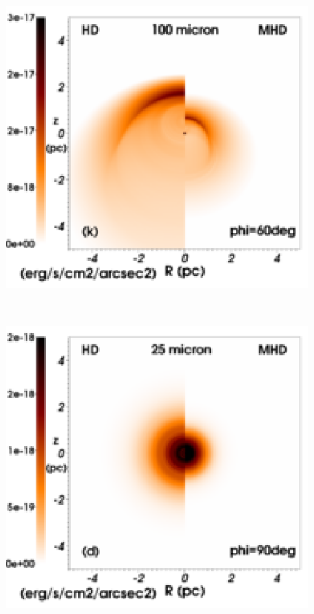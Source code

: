 \documentclass[useAMS,usenatbib]{mn2e}
\begin{document}
\begin{figure}
\begin{minipage}[b]{ 0.32\textwidth}
	\end{minipage}	
	\begin{minipage}[b]{ 0.32\textwidth}
	      \centering
	        \includegraphics[width=1.0\textwidth]{./map_2040_60deg_lambda100_legend.eps}
	\end{minipage}	\\
	\begin{minipage}[b]{ 0.32\textwidth}
			\centering
	        \includegraphics[width=1.0\textwidth]{./map_2040_90deg_lambda25_legend.eps}

\end{minipage}
\end{figure}
\end{document}

